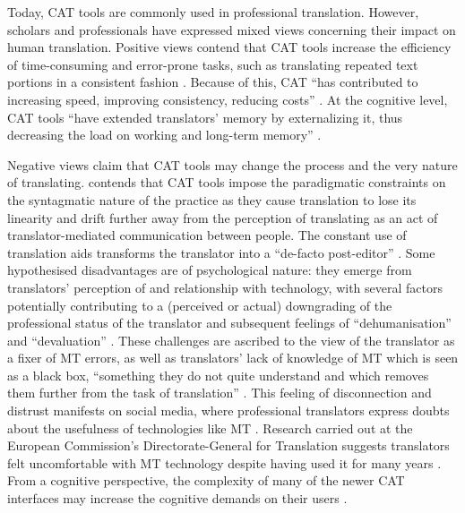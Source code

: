 \begin{sloppypar}
Today, CAT tools are commonly used in professional translation. However, scholars and professionals have expressed mixed views concerning their impact on human translation. Positive views contend that CAT tools increase the efficiency of time-consuming and error-prone tasks, such as translating repeated text portions in a consistent fashion \citep{o2012translation}. Because of this, CAT ``has contributed to increasing speed, improving consistency, reducing costs'' \citep{ehrensberger2014translatorbs}. At the cognitive level, CAT tools ``have extended translators’ memory by externalizing it, thus decreasing the load on working and long-term memory'' \citep{pym2011technology}.
\end{sloppypar}


Negative views claim that CAT tools may change the process and the very nature of translating. \citet{pym2011technology} contends that CAT tools impose the paradigmatic constraints on the syntagmatic nature of the practice as they cause translation to lose its linearity and drift further away from the perception of translating as an act of translator-mediated communication between people. The constant use of translation aids transforms the translator into a ``de-facto post-editor'' \citep{christensen2017mapping}. Some hypothesised disadvantages are of psychological nature: they emerge from translators’ perception of and relationship with technology, with several factors potentially contributing to a (perceived or actual) downgrading of the professional status of the translator and subsequent feelings of ``dehumanisation'' and ``devaluation'' \citep{o2012translation}. These challenges are ascribed to the view of the translator as a fixer of MT errors, as well as translators’ lack of knowledge of MT which is seen as a black box, ``something they do not quite understand and which removes them further from the task of translation'' \citep[109]{o2012translation}. This feeling of disconnection and distrust manifests on social media, where professional translators express doubts about the usefulness of technologies like MT \citep{laubli2017google}. Research carried out at the European Commission’s Directorate-General for Translation suggests translators felt uncomfortable with MT technology despite having used it for many years \citep{cadwell2016human}. From a cognitive perspective, the complexity of many of the newer CAT interfaces may increase the cognitive demands on their users \citep{hansen2012nutzbarkeit}.

